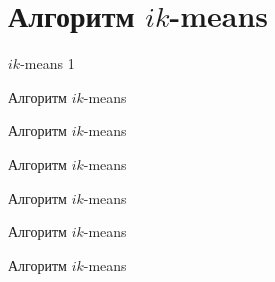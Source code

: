 \documentclass[aspectratio=169,tikz]{beamer}
\newcommand{\ikmeans}{\mbox{$ ik $-means}\xspace}
\begin{document}
	\section{Алгоритм \ikmeans}
		
	\begin{frame}{\ikmeans 1}
			\begin{figure} %
				\centering
				
			\end{figure}
	\end{frame}
	
	\begin{frame}{Алгоритм \ikmeans}
		\begin{figure} %
			\centering
			
		\end{figure}
	\end{frame}
			
	\begin{frame}{Алгоритм \ikmeans}
		\begin{figure} %
			\centering
			
		\end{figure}
	\end{frame}	
	
		
	\begin{frame}{Алгоритм \ikmeans}
		\begin{figure} %
			\centering
			
		\end{figure}
	\end{frame}		
		
	\begin{frame}{Алгоритм \ikmeans}
		\begin{figure} %
			\centering
			
		\end{figure}
	\end{frame}		
			
	\begin{frame}{Алгоритм \ikmeans}
		\begin{figure} %
			\centering
			
		\end{figure}
	\end{frame}		
	
	\begin{frame}{Алгоритм \ikmeans}
		\begin{figure} %
			\centering
			
		\end{figure}
	\end{frame}	
			
\end{document}

